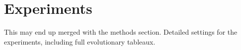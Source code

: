 \section{Experiments}
This may end up merged with the methods section. Detailed settings for the 
experiments, including full evolutionary tableaux.
